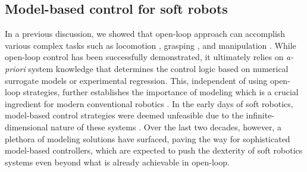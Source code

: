 \subsection{Model-based control for soft robots}
\label{sec:C0:modelbasedcontrol}
In a previous discussion, we showed that open-loop approach can accomplish various complex tasks such as locomotion \cite{Suzumori1992,Choi2011,Katzschmann2018}, grasping \cite{Suzumori1992}, and manipulation \cite{Marchese2016}. While open-loop control has been successfully demonstrated, it ultimately relies on \textit{a-priori} system knowledge that determines the control logic based on numerical surrogate models or experimental regression. This, independent of using open-loop strategies, further establishes the importance of modeling which is a crucial ingredient for modern conventional robotics \cite{Spong1996,Murray1994,Khatib1987}. 
In the early days of soft robotics, model-based control strategies were deemed unfeasible due to the infinite-dimensional nature of these systems \cite{DellaSantina2020}. Over the last two decades, however, a plethora of modeling solutions have surfaced, paving the way for sophisticated model-based controllers, which are expected to push the dexterity of soft robotics systems even beyond what is already achievable in open-loop.

